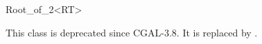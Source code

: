 \begin{ccRefClass}{Root_of_2<RT>}
\begin{ccDeprecated}
This class is deprecated since CGAL-3.8. It is replaced by .
\end{ccDeprecated}

\\
\end{ccRefClass}

